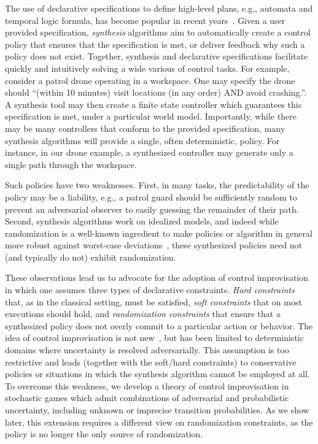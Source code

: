 The use of declarative specifications to define high-level plans, e.g.,
automata and temporal logic formula, has become popular in recent
years~\cite{DBLP:conf/iros/HorowitzWM14, DBLP:conf/rss/WongEK14, DBLP:conf/iros/HeLKV17, DBLP:conf/icra/FuATP16, DBLP:conf/icra/HeWKV19, DBLP:journals/arobots/MoarrefK20, DBLP:conf/icra/KantarosM0P20}.
Given a user provided specification, \emph{synthesis} algorithms aim
to automatically create a control policy that ensures that the
specification is met, or deliver feedback why such a policy does not
exist. Together, synthesis and declarative specifications facilitate
quickly and intuitively solving a wide various of control tasks.  For
example, consider a patrol drone operating in a workspace. One may
specify the drone should ``(within 10 minutes) visit locations (in any
order) AND avoid crashing.''. A synthesis tool may then create a
finite state controller which guarantees this specification is met,
under a particular world model.  
Importantly, while there may be many controllers
that conform to the provided specification, many synthesis algorithms
will provide a single, often deterministic, policy.  For instance, in
our drone example, a synthesized controller may generate only a
single path through the workspace.

Such policies have two weaknesses. First, in many tasks, the
predictability of the policy may be a liability, e.g., a patrol guard
should be sufficiently random to prevent an adversarial observer to
easily guessing the remainder of their path. Second, synthesis
algorithms work on idealized models, and indeed while randomization is
a well-known ingredient to make policies or algorithm in general more
robust against worst-case
deviations~\cite{mceThesis, maxEntAnswer},
these synthesized policies need not (and typically do not) exhibit randomization.

These observations lead us to advocate for the adoption of control
improvisation in which one assumes three types of declarative
constraints. \emph{Hard constraints} that, as in the classical
setting, must be satisfied, \emph{soft constraints} that on most
executions should hold, and \emph{randomization constraints} that
ensure that a synthesized policy does not overly commit to a
particular action or behavior. The idea of control improvisation is
not new~\cite{DBLP:conf/cav/FremontS18,DBLP:conf/fsttcs/FremontDSW15},
but has been limited to deterministic domains where uncertainty is
resolved adversarially. This assumption is too restrictive and leads
(together with the soft/hard constraints) to conservative policies or
situations in which the synthesis algorithm cannot be employed at
all. To overcome this weakness, we develop a theory of control
improvisation in stochastic games which admit combinations of
adversarial and probabilistic uncertainty, including unknown or imprecise
transition probabilities. As we show later, this extension requires a
different view on randomization constraints, as the policy is no
longer the only source of randomization.

